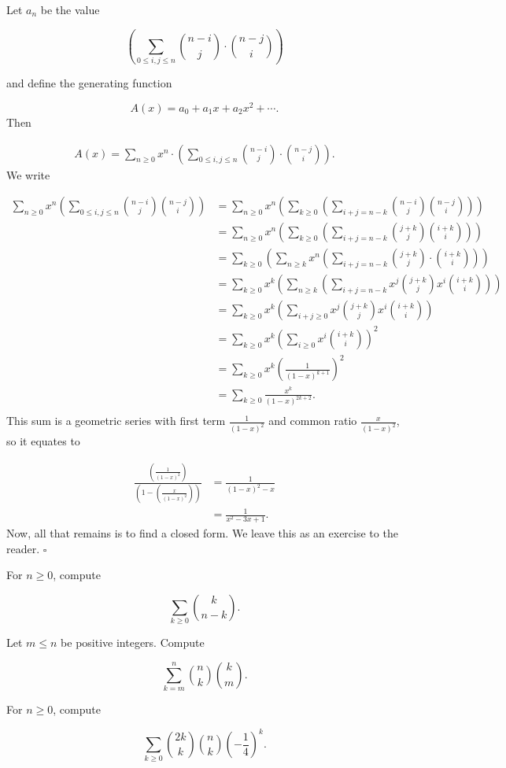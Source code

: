 \documentclass{article}
\begin{document}
\begin{sol}

Let $a_n$ be the value

\[\left(\sum_{0 \le i, j \le n} \binom{n-i}{j} \cdot \binom{n-j}{i}\right)\]

and define the generating function 

\[A(x) = a_0 + a_1x + a_2x^2 + \cdots.\]
Then

\begin{align*}
A(x) = \sum_{n \ge 0} x^n \cdot \left(\sum_{0 \le i, j \le n} \binom{n-i}{j} \cdot \binom{n-j}{i}\right).
\end{align*}
We write

\begin{align*}
\sum_{n \ge 0} x^n\left(\sum_{0 \le i, j \le n} \binom{n-i}{j}\binom{n-j}{i}\right) & = \sum_{n \ge 0} x^n\left(\sum_{k \ge 0} \left(\sum_{i+j=n-k} \binom{n-i}{j}\binom{n-j}{i}\right)\right)\\
& = \sum_{n \ge 0} x^n\left(\sum_{k \ge 0} \left(\sum_{i+j=n-k} \binom{j+k}{j}\binom{i+k}{i}\right)\right)\\
& = \sum_{k \ge 0} \left(\sum_{n \ge k} x^n \left(\sum_{i+j=n-k} \binom{j+k}{j} \cdot \binom{i+k}{i}\right)\right)\\
& = \sum_{k \ge 0} x^k \left(\sum_{n \ge k} \left(\sum_{i+j=n-k} x^j\binom{j+k}{j} x^i\binom{i+k}{i}\right)\right)\\
& = \sum_{k \ge 0} x^k \left(\sum_{i+j \ge 0} x^j\binom{j+k}{j} x^i\binom{i+k}{i}\right)\\
& = \sum_{k \ge 0} x^k \left(\sum_{i \ge 0} x^i\binom{i+k}{i}\right)^2\\
& = \sum_{k \ge 0} x^k \left(\frac{1}{(1-x)^{k+1}}\right)^2\\
& = \sum_{k \ge 0} \frac{x^k}{(1-x)^{2k+2}}.\\
\end{align*}
This sum is a geometric series with first term $\frac{1}{(1-x)^2}$ and common ratio $\frac{x}{(1-x)^2}$, so it equates to

\begin{align*}
\frac{\left(\frac{1}{(1-x)^2}\right)}{\left(1-\left(\frac{x}{(1-x)^2}\right)\right)} & = \frac{1}{(1-x)^2 - x}\\
& = \frac{1}{x^2 - 3x + 1}.
\end{align*}
Now, all that remains is to find a closed form. We leave this as an exercise to the reader. $\square$
\end{sol}

\newpage

\begin{exer}
For $n \ge 0$, compute

\[\sum_{k \ge 0}\binom{k}{n-k}.\]
\end{exer}

\begin{exer}
Let $m \le n$ be positive integers. Compute

\[\sum_{k=m}^n \binom{n}{k}\binom{k}{m}.\]
\end{exer}

\begin{exer}
For $n \ge 0$, compute

\[\sum_{k \ge 0} \binom{2k}{k}\binom{n}{k}\left(-\frac14\right)^k.\]
\end{exer}
\end{document}
